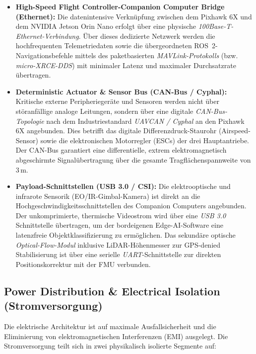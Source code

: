 \begin{itemize}
    \item \textbf{High-Speed Flight Controller-Companion Computer Bridge (Ethernet):} Die datenintensive Verknüpfung zwischen dem Pixhawk 6X und dem NVIDIA Jetson Orin Nano erfolgt über eine physische \textit{100Base-T-Ethernet-Verbindung}. 
                                                                                      Über dieses dedizierte Netzwerk werden die hochfrequenten Telemetriedaten sowie die übergeordneten ROS~2-Navigationsbefehle mittels des paketbasierten 
                                                                                      \textit{MAVLink-Protokolls} (bzw. \textit{micro-XRCE-DDS}) mit minimaler Latenz und maximaler Durchsatzrate übertragen.
    \item \textbf{Deterministic Actuator \& Sensor Bus (CAN-Bus / Cyphal):} Kritische externe Peripheriegeräte und Sensoren werden nicht über störanfällige analoge Leitungen, sondern über eine digitale \textit{CAN-Bus-Topologie} 
                                                                            nach dem Industriestandard \textit{UAVCAN / Cyphal} an den Pixhawk 6X angebunden. Dies betrifft das digitale Differenzdruck-Staurohr (Airspeed-Sensor) 
                                                                            sowie die elektronischen Motorregler (ESCs) der drei Hauptantriebe. Der CAN-Bus garantiert eine differentielle, extrem elektromagnetisch abgeschirmte 
                                                                            Signalübertragung über die gesamte Tragflächenspannweite von $3\,\text{m}$.
    \item \textbf{Payload-Schnittstellen (USB 3.0 / CSI):} Die elektrooptische und infrarote Sensorik (EO/IR-Gimbal-Kamera) ist direkt an die Hochgeschwindigkeitsschnittstellen des Companion Computers angebunden. 
                                                           Der unkomprimierte, thermische Videostrom wird über eine \textit{USB 3.0} Schnittstelle übertragen, um der bordeigenen Edge-AI-Software eine latenzfreie Objektklassifizierung zu ermöglichen. 
                                                           Das sekundäre optische \textit{Optical-Flow-Modul} inklusive LiDAR-Höhenmesser zur GPS-denied Stabilisierung ist über eine serielle \textit{UART}-Schnittstelle zur 
                                                           direkten Positionskorrektur mit der FMU verbunden.
\end{itemize}

\subsection{Power Distribution \& Electrical Isolation (Stromversorgung)}
Die elektrische Architektur ist auf maximale Ausfallsicherheit und die Eliminierung von elektromagnetischen Interferenzen (EMI) ausgelegt. Die Stromversorgung teilt sich in zwei physikalisch isolierte Segmente auf:

